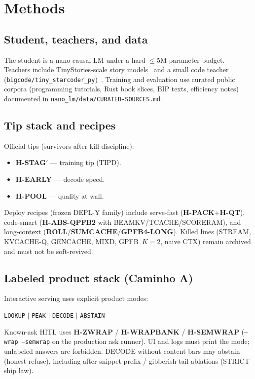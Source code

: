 \section{Methods}
\label{sec:methods}

\subsection{Student, teachers, and data}
The student is a nano causal LM under a hard $\leq$5M parameter budget.
Teachers include TinyStories-scale story models~\cite{tinystories} and a small
code teacher (\texttt{bigcode/tiny\_starcoder\_py})~\cite{tinystarcoder}.
Training and evaluation use curated public corpora (programming tutorials,
Rust book slices, BIP texts, efficiency notes) documented in
\texttt{nano\_lm/data/CURATED-SOURCES.md}.

\subsection{Tip stack and recipes}
Official tips (survivors after kill discipline):
\begin{itemize}
  \item \textbf{H-STAG$'$} --- training tip (TIPD).
  \item \textbf{H-EARLY} --- decode speed.
  \item \textbf{H-POOL} --- quality at wall.
\end{itemize}
Deploy recipes (frozen DEPL-Y family) include serve-fast (\textbf{H-PACK}+\textbf{H-QT}),
code-smart (\textbf{H-ABS-QPFB2} with BEAMKV/TCACHE/SCORERAM), and long-context
(\textbf{ROLL}/\textbf{SUMCACHE}/\textbf{GPFB4-LONG}).
Killed lines (STREAM, KVCACHE-Q, GENCACHE, MIXD, GPFB~$K{=}2$, naive CTX) remain
archived and must not be soft-revived.

\subsection{Labeled product stack (Caminho A)}
Interactive serving uses explicit product modes:
\begin{center}
\texttt{LOOKUP} $\mid$ \texttt{PEAK} $\mid$ \texttt{DECODE} $\mid$ \texttt{ABSTAIN}
\end{center}
Known-ask HITL uses \textbf{H-ZWRAP} / \textbf{H-WRAPBANK} / \textbf{H-SEMWRAP}
(\texttt{--wrap --semwrap} on the production ask runner).
UI and logs must print the mode; unlabeled answers are forbidden.
DECODE without content bars may abstain (honest refuse), including after
snippet-prefix / gibberish-tail ablations (STRICT ship law).

